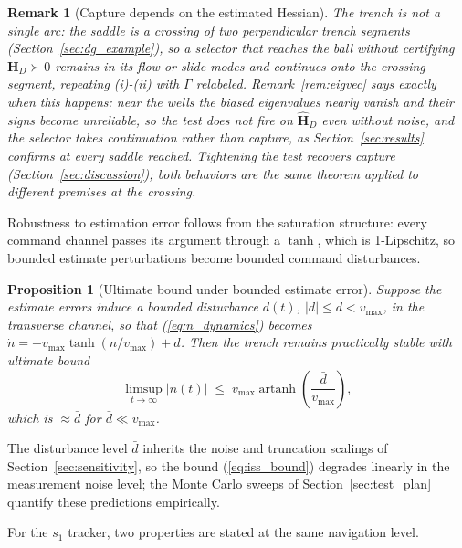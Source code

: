 \documentclass[lettersize,journal]{IEEEtran}
\newtheorem{proposition}{Proposition}
\newtheorem{remark}{Remark}
\begin{document}
\begin{remark}[Capture depends on the estimated Hessian]
\label{rem:capture_gap}
The trench is not a single arc: the saddle is a crossing of two
perpendicular trench segments (Section~\ref{sec:dg_example}), so a
selector that reaches the ball without certifying $\mathbf{H}_D \succ
0$ remains in its flow or slide modes and continues onto the crossing
segment, repeating (i)-(ii) with $\Gamma$ relabeled.
Remark~\ref{rem:eigvec} says exactly when this happens: near the wells
the biased eigenvalues nearly vanish and their signs become unreliable,
so the test does not fire on $\hat{\mathbf{H}}_D$ even without noise,
and the selector takes continuation rather than capture, as
Section~\ref{sec:results} confirms at every saddle reached. Tightening
the test recovers capture (Section~\ref{sec:discussion}); both
behaviors are the same theorem applied to different premises at the
crossing.
\end{remark}

Robustness to estimation error follows from the saturation structure:
every command channel passes its argument through a $\tanh$, which is
1-Lipschitz, so bounded estimate perturbations become bounded command
disturbances.

\begin{proposition}[Ultimate bound under bounded estimate error]
\label{prop:iss}
Suppose the estimate errors induce a bounded disturbance $d(t)$, $|d|
\leq \bar{d} < v_{\max}$, in the transverse channel, so that
(\ref{eq:n_dynamics}) becomes $\dot{n} = -v_{\max}\tanh(n/v_{\max}) +
d$. Then the trench remains practically stable with ultimate bound
\begin{equation}
    \limsup_{t\to\infty} |n(t)| \;\leq\;
    v_{\max}\operatorname{artanh}\!\left(\frac{\bar{d}}{v_{\max}}\right),
    \label{eq:iss_bound}
\end{equation}
which is $\approx \bar{d}$ for $\bar{d} \ll v_{\max}$.
\end{proposition}

The disturbance level $\bar{d}$ inherits the noise and truncation
scalings of Section~\ref{sec:sensitivity}, so the bound
(\ref{eq:iss_bound}) degrades linearly in the measurement noise level;
the Monte Carlo sweeps of Section~\ref{sec:test_plan} quantify these
predictions empirically.

For the $s_1$ tracker, two properties are stated at the same
navigation level.
\end{document}
